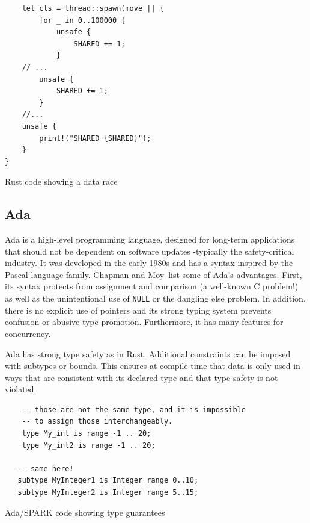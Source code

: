 \documentclass[nomenclature, english, bibtex]{kththesis}
\begin{document}
\begin{listing}[!ht]
\begin{verbatim}
    let cls = thread::spawn(move || {
        for _ in 0..100000 {
            unsafe {
                SHARED += 1;
            }
    // ...
        unsafe {
            SHARED += 1;
        }
    //...
    unsafe {
        print!("SHARED {SHARED}");
    }
}
\end{verbatim}
\caption[Rust code showing a data race]{Rust code showing a data race }
\label{lstlisting:data_race2}
\end{listing}
\FloatBarrier



\subsection{Ada}

Ada is a high-level programming language, designed for long-term applications that should not be dependent on software updates -typically the safety-critical industry. It was developed in the early 1980s and has a syntax inspired by the Pascal language family.
Chapman and Moy\,\cite{chapman_adacore_2018} list some of Ada's advantages. First, its syntax protects from assignment and comparison (a well-known C problem!) as well as the unintentional use of \texttt{NULL} or the dangling else problem. In addition, there is no explicit use of pointers and its strong typing system prevents confusion or abusive type promotion. Furthermore, it has many features for concurrency.

Ada has strong type safety as in Rust. Additional constraints can be imposed with subtypes or bounds. This ensures at compile-time that data is only used in ways that are consistent with its declared type and that type-safety is not violated.

 \begin{listing}[!ht]
    \begin{verbatim}
    -- those are not the same type, and it is impossible
    -- to assign those interchangeably.
    type My_int is range -1 .. 20;
    type My_int2 is range -1 .. 20;
   
   -- same here!
   subtype MyInteger1 is Integer range 0..10;
   subtype MyInteger2 is Integer range 5..15;
\end{verbatim}
\caption[Ada/SPARK code showing type guarantees]{Ada/SPARK code showing type guarantees}
\label{lstlisting:spark_datatypes}
 \end{listing}
\end{document}
